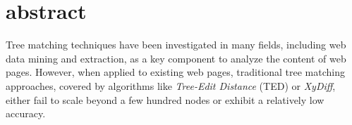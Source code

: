 \section{abstract}
Tree matching techniques have been investigated in many fields, including web data mining and extraction, as a key component to analyze the content of web pages.
However, when applied to existing web pages, traditional tree matching approaches, covered by algorithms like \emph{Tree-Edit Distance} (TED) or \emph{XyDiff}, either fail to scale beyond a few hundred nodes or exhibit a relatively low accuracy.

